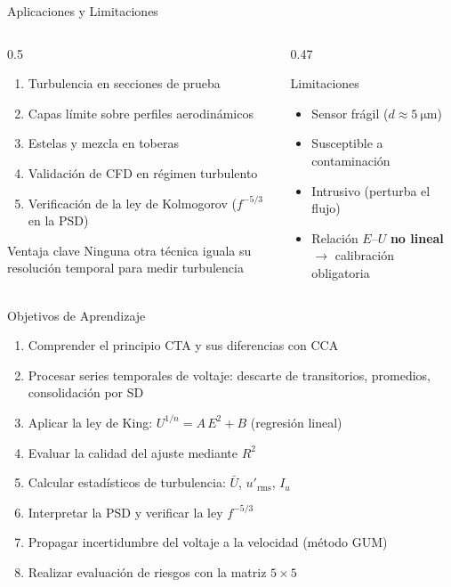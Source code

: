 \documentclass[aspectratio=169,12pt]{beamer}
\begin{document}
\begin{frame}{Aplicaciones y Limitaciones}
	\begin{columns}
		\begin{column}{0.5\textwidth}
			\begin{enumerate}\small
				\item Turbulencia en secciones de prueba
				\item Capas límite sobre perfiles aerodinámicos
				\item Estelas y mezcla en toberas
				\item Validación de CFD en régimen turbulento
				\item Verificación de la ley de Kolmogorov
				      ($f^{-5/3}$ en la PSD)
			\end{enumerate}
			\vspace{0.3em}
			\begin{exampleblock}{Ventaja clave}
				Ninguna otra técnica iguala su resolución
				temporal para medir turbulencia
			\end{exampleblock}
		\end{column}
		\begin{column}{0.47\textwidth}
			\begin{alertblock}{Limitaciones}
				\begin{itemize}\small
					\item Sensor frágil ($d \approx \SI{5}{\micro\metre}$)
					\item Susceptible a contaminación
					\item Intrusivo (perturba el flujo)
					\item Relación $E$--$U$ \textbf{no lineal}
					      $\to$ calibración obligatoria
				\end{itemize}
			\end{alertblock}
		\end{column}
	\end{columns}
\end{frame}

\begin{frame}{Objetivos de Aprendizaje}
	\begin{enumerate}
		\item Comprender el principio CTA y sus diferencias con CCA
		\item Procesar series temporales de voltaje: descarte de
		      transitorios, promedios, consolidación por SD
		\item Aplicar la ley de King: $U^{1/n} = A\,E^2 + B$
		      (regresión lineal)
		\item Evaluar la calidad del ajuste mediante $R^2$
		\item Calcular estadísticos de turbulencia: $\bar{U}$,
		      $u'_\mathrm{rms}$, $I_u$
		\item Interpretar la PSD y verificar la ley $f^{-5/3}$
		\item Propagar incertidumbre del voltaje a la velocidad
		      (método GUM)
		\item Realizar evaluación de riesgos con la matriz $5\times5$
	\end{enumerate}
\end{frame}
\end{document}
